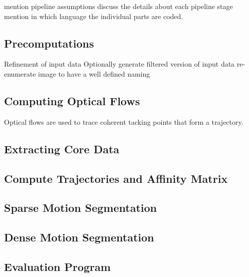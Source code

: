 mention pipeline assumptions
discuss the details about each pipeline stage
mention in which language the individual parts are coded.

\subsection{Precomputations}
Refinement of input data
Optionally generate filtered version of input data
re-enumerate image to have a well defined naming

\subsection{Computing Optical Flows}

Optical flows are used to trace coherent tacking points that form a trajectory.

\subsection{Extracting Core Data}
\subsection{Compute Trajectories and Affinity Matrix}
\subsection{Sparse Motion Segmentation}
\subsection{Dense Motion Segmentation}
\subsection{Evaluation Program}
